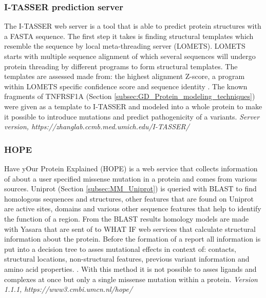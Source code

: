 \subsubsection{I-TASSER prediction server}
The I-TASSER web server is a tool that is able to predict protein structures with a FASTA sequence. The first step it takes is finding structural templates which resemble the sequence by local meta-threading server (LOMETS).
LOMETS starts with multiple sequence alignment of which several sequences will undergo protein threading by different programs to form structural templates. 
The templates are assessed made from: the highest alignment Z-score, a program within LOMETS specific confidence score and sequence identity \cite{zhang_lab_lomets_nodate, wu_lomets:_2007}.
The known fragments of TNFRSF1A (Section \ref{subsec:GD_Protein_modeling_techniques}) were given as a template to I-TASSER and modeled into a whole protein to make it possible to introduce mutations and predict pathogenicity of a variants.
\label{subsec:MM_I_TASSER}
\newline
\textit{Server version, https://zhanglab.ccmb.med.umich.edu/I-TASSER/}

\subsubsection{HOPE}
Have yOur Protein Explained (HOPE) is a web service that collects information of about a user specified missense mutation in a protein and comes from various sources. Uniprot (Section \ref{subsec:MM_Uniprot}) is queried with BLAST to find homologous sequences and structures, other features that are found on Uniprot are active sites, domains and various other sequence features that help to identify the function of a region. From the BLAST results homology models are made with Yasara that are sent of to WHAT IF web services that calculate structural information about the protein. Before the formation of a report all information is put into a decision tree to asses mutational effects in context of: contacts, structural locations, non-structural features, previous variant information and amino acid properties. \cite{venselaar_protein_2010,cmbi_hope_nodate,cmbi_hope_nodate-1,cmbi_hope_nodate-2}.
With this method it is not possible to asses ligands and complexes at once but only a single missense mutation within a protein.
\label{subsec:MM_HOPE}
\textit{Version 1.1.1, https://www3.cmbi.umcn.nl/hope/}

